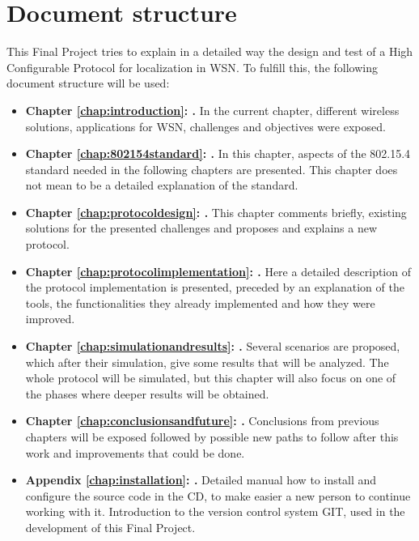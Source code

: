 \section{Document structure}

This Final Project tries to explain in a detailed way the design and test of a High Configurable Protocol for localization in \ac{WSN}. To 
fulfill this, the following document structure will be used:

\begin{itemize}
 \item \textbf{Chapter \ref{chap:introduction}: .} In the current chapter, different wireless solutions, applications
for \ac{WSN}, challenges and objectives were exposed.
 \item \textbf{Chapter \ref{chap:802154standard}: .} In this chapter, aspects of the 802.15.4 standard needed
in the following chapters are presented. This chapter does not mean to be a detailed explanation of the standard.
 \item \textbf{Chapter \ref{chap:protocoldesign}: .} This chapter comments briefly, existing solutions for the
presented challenges and proposes and explains a new protocol.
 \item \textbf{Chapter \ref{chap:protocolimplementation}: .} Here a detailed description of the protocol 
implementation is presented, preceded by an explanation of the tools, the functionalities they already implemented and how they were
improved.
 \item \textbf{Chapter \ref{chap:simulationandresults}: .} Several scenarios are proposed, which after their
simulation, give some results that will be analyzed. The whole protocol will be simulated, but this chapter will also focus on one of the 
phases where deeper results will be obtained.
 \item \textbf{Chapter \ref{chap:conclusionsandfuture}: .} Conclusions from previous chapters will be 
exposed followed by possible new paths to follow after this work and improvements that could be done.
 \item \textbf{Appendix \ref{chap:installation}: .} Detailed manual how to install and configure the source code in 
the \ac{CD}, to make easier a new person to continue working with it. Introduction to the version control system GIT, used in the development of 
this Final Project.
\end{itemize}

